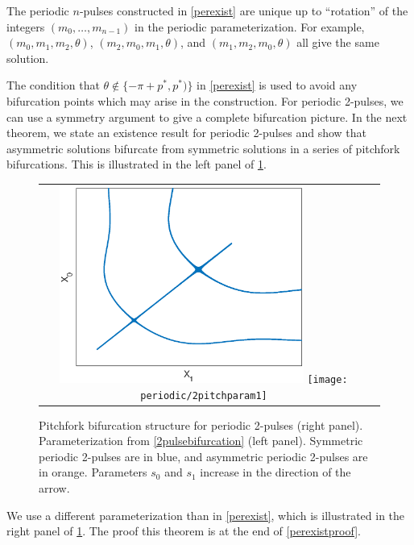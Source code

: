 \documentclass[thesis.tex]{subfiles}
\begin{document}
\begin{remark}\label{remark:cyclicperm}
The periodic $n$-pulses constructed in \cref{perexist} are unique up to ``rotation'' of the integers $(m_0, \dots, m_{n-1})$ in the periodic parameterization. For example, $(m_0, m_1, m_2, \theta)$, $(m_2, m_0, m_1, \theta)$, and $(m_1, m_2, m_0, \theta)$ all give the same solution.
\end{remark}

The condition that $\theta \notin \{-\pi + p^*, p^*) \}$ in \cref{perexist} is used to avoid any bifurcation points which may arise in the construction. For periodic 2-pulses, we can use a symmetry argument to give a complete bifurcation picture. In the next theorem, we state an existence result for periodic 2-pulses and show that asymmetric solutions bifurcate from symmetric solutions in a series of pitchfork bifurcations. This is illustrated in the left panel of \cref{fig:2pitch}. 
\begin{figure}
\begin{center}
\begin{tabular}{cc}
\includegraphics[width=8cm]{periodic/2pitchfork.eps}
\texttt{[image: periodic/2pitchparam1]}
\end{tabular}
\end{center}
\caption[Pitchfork bifurcation structure for periodic 2-pulses]{Pitchfork bifurcation structure for periodic 2-pulses (right panel). Parameterization from \cref{2pulsebifurcation} (left panel). Symmetric periodic 2-pulses are in blue, and asymmetric periodic 2-pulses are in orange. Parameters $s_0$ and $s_1$ increase in the direction of the arrow.}
\label{fig:2pitch}
\end{figure} 
We use a different parameterization than in \cref{perexist}, which is illustrated in the right panel of \cref{fig:2pitch}. The proof this theorem is at the end of \cref{perexistproof}.
\end{document}
